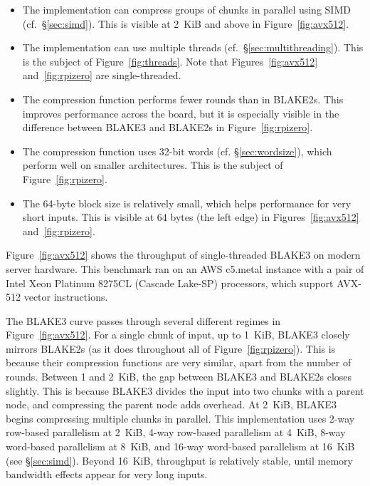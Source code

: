 \documentclass[11pt,notitlepage,a4paper]{article}
\begin{document}
\begin{itemize}
    \item The implementation can compress groups of chunks in parallel using
        SIMD (cf.~\S\ref{sec:simd}). This is visible at 2~KiB and above in
        Figure~\ref{fig:avx512}.
    \item The implementation can use multiple threads
        (cf.~\S\ref{sec:multithreading}). This is the subject of
        Figure~\ref{fig:threads}. Note that Figures~\ref{fig:avx512}
        and~\ref{fig:rpizero} are single-threaded.
    \item The compression function performs fewer rounds than in BLAKE2s. This
        improves performance across the board, but it is especially visible in
        the difference between BLAKE3 and BLAKE2s in Figure~\ref{fig:rpizero}.
    \item The compression function uses 32-bit words (cf.
        \S\ref{sec:wordsize}), which perform well on smaller architectures.
        This is the subject of Figure~\ref{fig:rpizero}.
    \item The 64-byte block size is relatively small, which helps performance
        for very short inputs. This is visible at 64 bytes (the left edge) in
        Figures~\ref{fig:avx512} and~\ref{fig:rpizero}.
\end{itemize}

Figure~\ref{fig:avx512} shows the throughput of single-threaded BLAKE3 on
modern server hardware. This benchmark ran on an AWS c5.metal instance with a
pair of Intel Xeon Platinum 8275CL (Cascade Lake-SP) processors, which support
AVX-512 vector instructions.

The BLAKE3 curve passes through several different regimes in
Figure~\ref{fig:avx512}. For a single chunk of input, up to 1~KiB, BLAKE3
closely mirrors BLAKE2s (as it does throughout all of
Figure~\ref{fig:rpizero}). This is because their compression functions are very
similar, apart from the number of rounds. Between 1 and 2~KiB, the gap between
BLAKE3 and BLAKE2s closes slightly. This is because BLAKE3 divides the input
into two chunks with a parent node, and compressing the parent node adds
overhead. At 2~KiB, BLAKE3 begins compressing multiple chunks in parallel. This
implementation uses 2-way row-based parallelism at 2~KiB, 4-way row-based
parallelism at 4~KiB, 8-way word-based parallelism at 8~KiB, and 16-way
word-based parallelism at 16~KiB (see \S\ref{sec:simd}). Beyond 16~KiB,
throughput is relatively stable, until memory bandwidth effects appear for very
long inputs.
\end{document}
